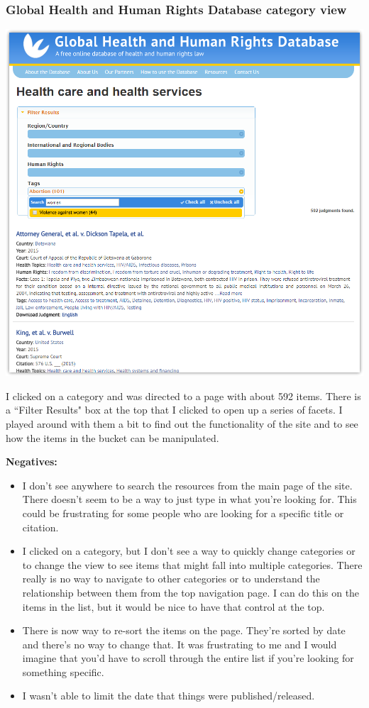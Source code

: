 \documentclass{article}
\begin{document}
\subsubsection{Global Health and Human Rights Database category view}
\noindent\includegraphics[width=\textwidth]{2016-06-09-Global-Health-Categories}

\noindent I clicked on a category and was directed to a page with about 592 items. There is a ``Filter Results" box at the top that I clicked to open up a series of facets. I played around with them a bit to find out the functionality of the site and to see how the items in the bucket can be manipulated.

\noindent\textbf{Negatives:}
\begin{itemize}
\itemsep0em 
    \item I don't see anywhere to search the resources from the main page of the site. There doesn't seem to be a way to just type in what you're looking for. This could be frustrating for some people who are looking for a specific title or citation.
    \item I clicked on a category, but I don't see a way to quickly change categories or to change the view to see items that might fall into multiple categories. There really is no way to navigate to other categories or to understand the relationship between them from the top navigation page. I can do this on the items in the list, but it would be nice to have that control at the top.
    \item There is now way to re-sort the items on the page. They're sorted by date and there's no way to change that. It was frustrating to me and I would imagine that you'd have to scroll through the entire list if you're looking for something specific. 
    \item  I wasn't able to limit the date that things were published/released.
\end{itemize}
\end{document}
